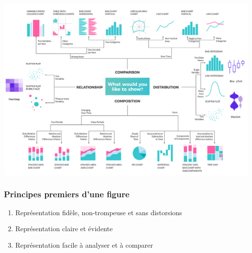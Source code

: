 \documentclass[aspectratio=169]{beamer}
\begin{document}
\begin{frame}[c]
    
\vspace{-1pt}
\centering
\includegraphics[height=\paperheight]{figures/types_of_charts.png}


\end{frame}






\begin{frame}[c]\frametitle{Principes premiers d'une figure}

\begin{enumerate}\setlength\itemsep{2em}
	\item Représentation fidèle, non-trompeuse et sans distorsions

	\item Représentation claire et évidente

	\item Représentation facile à analyser et à comparer
\end{enumerate}

\end{frame}
\end{document}
